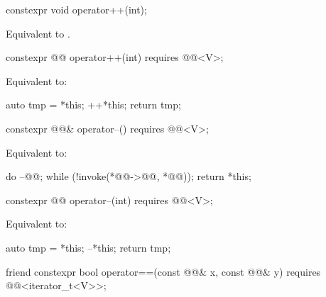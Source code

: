%
\begin{itemdecl}
constexpr void operator++(int);
\end{itemdecl}

\begin{itemdescr}
\pnum
\effects
Equivalent to .
\end{itemdescr}

%
\begin{itemdecl}
constexpr @@ operator++(int) requires @@<V>;
\end{itemdecl}

\begin{itemdescr}
\pnum
\effects
Equivalent to:
\begin{codeblock}
auto tmp = *this;
++*this;
return tmp;
\end{codeblock}
\end{itemdescr}

%
\begin{itemdecl}
constexpr @@& operator--() requires @@<V>;
\end{itemdecl}

\begin{itemdescr}
\pnum
\effects
Equivalent to:
\begin{codeblock}
do
  --@@;
while (!invoke(*@@->@@, *@@));
return *this;
\end{codeblock}
\end{itemdescr}

%
\begin{itemdecl}
constexpr @@ operator--(int) requires @@<V>;
\end{itemdecl}

\begin{itemdescr}
\pnum
\effects
Equivalent to:
\begin{codeblock}
auto tmp = *this;
--*this;
return tmp;
\end{codeblock}
\end{itemdescr}

%
\begin{itemdecl}
friend constexpr bool operator==(const @@& x, const @@& y)
  requires @@<iterator_t<V>>;
\end{itemdecl}


